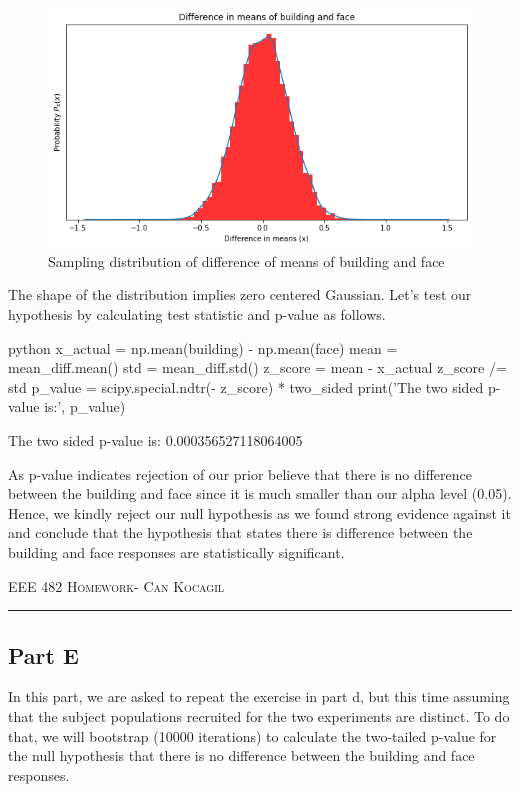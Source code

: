 \documentclass[12pt]{amsart}
\begin{document}
\begin{figure}[h]
    \centering
    \includegraphics[width = 1\textwidth]{images/10.png}
    \caption{Sampling distribution of difference of means of building and face}
\end{figure}

The shape of the distribution implies zero centered Gaussian. Let's test our hypothesis by calculating test statistic and p-value as follows.

\begin{mintedbox}{python}
x_actual = np.mean(building) - np.mean(face)
mean = mean_diff.mean()
std = mean_diff.std()
z_score = mean - x_actual
z_score /= std
p_value = scipy.special.ndtr(- z_score) * two_sided
print('The two sided p-value is:', p_value)
\end{mintedbox}

The two sided p-value is: 0.000356527118064005
\bigskip

As p-value indicates rejection of our prior believe that there is no difference between the building and face since it is much smaller than our alpha level (0.05). Hence, we kindly reject our null hypothesis as we found strong evidence against it and conclude that the hypothesis that states there is difference between the building and face responses are statistically significant. 

\newpage
{\scshape EEE 482} \hfill {\scshape \large  Homework-\relax} \hfill {\scshape Can Kocagil}
\smallskip
\hrule
\vspace{2mm}


\subsection{Part E}
In this part, we are asked to repeat the exercise in part d, but this time assuming that the subject populations
recruited for the two experiments are distinct. To do that, we will bootstrap (10000 iterations) to calculate the two-tailed p-value for the null hypothesis that there is no difference between the building and face responses. 
\end{document}
